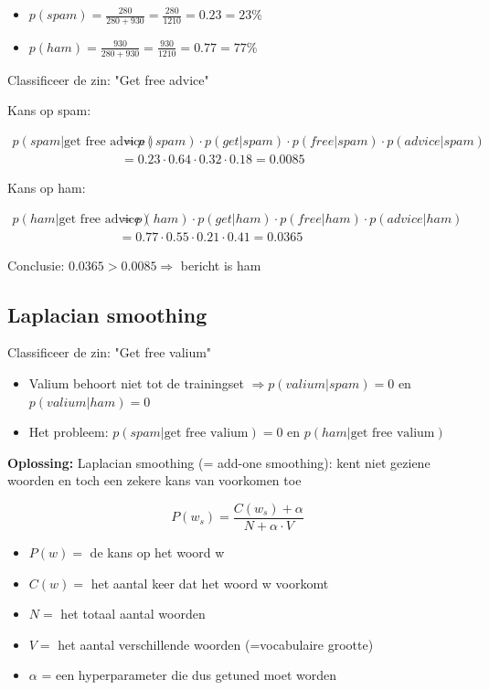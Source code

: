 \documentclass{article}
\begin{document}
\begin{itemize}
    \item $p(spam) = \frac{280}{280 + 930} = \frac{280}{1210} = 0.23 = 23\%$
    \item $p(ham) = \frac{930}{280 + 930} = \frac{930}{1210} = 0.77 = 77\%$
\end{itemize}

Classificeer de zin: "Get free advice"

Kans op spam:

\begin{align*}
    p(spam | \text{get free advice}) & = p(spam) \cdot p(get|spam) \cdot p(free|spam) \cdot p(advice | spam)\\
    & = 0.23 \cdot 0.64 \cdot 0.32 \cdot 0.18 = 0.0085
\end{align*}

Kans op ham:

\begin{align*}
    p(ham | \text{get free advice}) & = p(ham) \cdot p(get|ham) \cdot p(free|ham) \cdot p(advice | ham)\\
    & = 0.77 \cdot 0.55 \cdot 0.21 \cdot 0.41 = 0.0365
\end{align*}

Conclusie: $0.0365 > 0.0085 \Rightarrow$ bericht is ham

\subsection{Laplacian smoothing}

Classificeer de zin: "Get free valium"

\begin{itemize}
    \item Valium behoort niet tot de trainingset $\Rightarrow p(valium | spam) = 0$ en $p(valium | ham) = 0$
    \item Het probleem: $p(spam | \text{get free valium}) = 0$ en $p(ham | \text{get free valium})$
\end{itemize}

\textbf{Oplossing:} Laplacian smoothing (= add-one smoothing): kent niet geziene woorden en toch een zekere kans van voorkomen toe

\begin{equation}
    P(w_s) = \frac{C(w_s) + \alpha}{N + \alpha \cdot V}
\end{equation}

\begin{itemize}
    \item $P(w) =$ de kans op het woord w
    \item $C(w) =$ het aantal keer dat het woord w voorkomt
    \item $N =$ het totaal aantal woorden
    \item $V =$ het aantal verschillende woorden (=vocabulaire grootte)
    \item $\alpha$ = een hyperparameter die dus getuned moet worden
\end{itemize}
\end{document}
